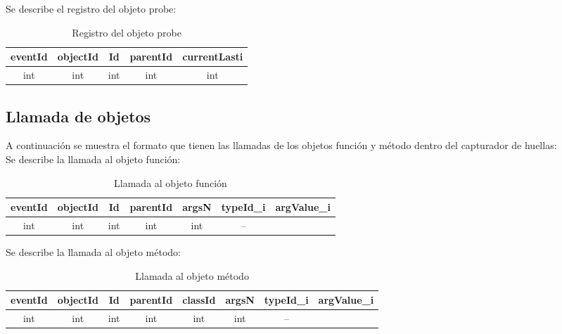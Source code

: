 \documentclass[10pt,a4paper]{article}
\begin{document}
Se describe el registro del objeto probe: \\

\begin{table}[!h]
\begin{center}
\begin{tabular}{| c | c | c | c | c |}
\hline
eventId & objectId & Id & parentId & currentLasti \\
\hline
int & int & int & int & int\\
\hline
\end{tabular}
\caption{Registro del objeto probe} 
\end{center}
\end{table}

\newpage
\subsection{Llamada de objetos}

A continuación se muestra el formato que tienen las llamadas de los objetos función y método dentro del capturador de huellas:\\

Se describe la llamada al objeto función:\\

\begin{table}[!h]
\begin{center}
\begin{tabular}{| c | c | c | c | c | c | c |}
\hline
eventId & objectId & Id & parentId & argsN & typeId_{i} & argValue_{i}\\
\hline
int & int & int & int & int & --\footnotemark[1]\\
\hline
\end{tabular}
\caption{Llamada al objeto función} 
\end{center}
\end{table}

Se describe la llamada al objeto método:\\

\begin{table}[!h]
\begin{center}
\begin{tabular}{| c | c | c | c | c | c | c | c |}
\hline
eventId & objectId & Id & parentId & classId & argsN & typeId_{i} & argValue_{i}\\
\hline
int & int & int & int & int & int & --\footnotemark[1]\\
\hline
\end{tabular}
\caption{Llamada al objeto método} 
\end{center}
\end{table}
\end{document}
